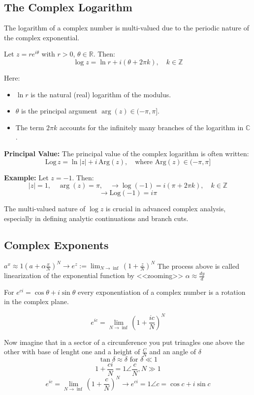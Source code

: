\subsection{The Complex Logarithm}

The logarithm of a complex number is multi-valued due to the periodic nature of the complex exponential.

Let \( z = re^{i\theta} \) with \( r > 0 \), \( \theta \in \mathbb{R} \). Then:
\[
	\log z = \ln r + i(\theta + 2\pi k), \quad k \in \mathbb{Z}
\]

Here:
\begin{itemize}[label=\(-\)]
	\item \( \ln r \) is the natural (real) logarithm of the modulus.
	\item \( \theta \) is the principal argument \( \arg(z) \in (-\pi, \pi] \).
	\item The term \( 2\pi k \) accounts for the infinitely many branches of the logarithm in \( \mathbb{C} \).
\end{itemize}

\textbf{Principal Value:}
The principal value of the complex logarithm is often written:
\[
	\mathrm{Log}\,z = \ln |z| + i\,\mathrm{Arg}(z), \quad \text{where } \mathrm{Arg}(z) \in (-\pi, \pi]
\]

\textbf{Example:}
Let \( z = -1 \). Then:
\[
	|z| = 1, \quad \arg(z) = \pi, \quad \to \log(-1) = i(\pi + 2\pi k), \quad k \in \mathbb{Z}
\]
\[
	\to \mathrm{Log}(-1) = i\pi
\]

The multi-valued nature of \( \log z \) is crucial in advanced complex analysis, especially in defining analytic continuations and branch cuts.

\subsection{Complex Exponents}
\(a^x \approx 1 \left(a + \alpha \frac{x}{N} \right)^N \to e^z := \lim_{N \rightarrow \inf} \left( 1 + \frac{z}{N}\right)^N \)
The process above is called linearization of the exponential function by <<zooming>>  \(\alpha \approx \frac{dy}{d}\)

 For  \(e^{ci} = \cos{\theta} + i\sin{\theta}\) every exponentiation of a complex number is a rotation 
in the complex plane.

\[
	e^{ic} = \lim_{N \to \inf} \left( 1 + \frac{ic}{N}\right)^N
\]

 Now imagine that in a sector of a circunference you put trinagles one above the other with base of lenght one and a height of $\frac{C}{N}$ and an angle of $\delta$
\[
	\tan{\delta} \approx \delta \text{ for } \delta \ll 1
\]
\[
	1 + \frac{ci}{N} = 1 \angle \frac{c}{N}, N \gg 1
\]
\[
	e^{ic} = \lim_{N \to \inf} \left( 1 + \frac{c}{N}\right)^N \to e^{ci} = 1 \angle c = \cos{c} + i\sin{c}
\]

